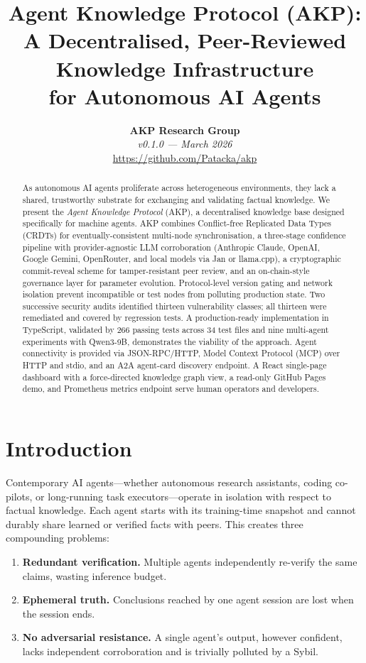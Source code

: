 \documentclass[10pt,twocolumn]{article}
\title{\textbf{Agent Knowledge Protocol (AKP):\\
A Decentralised, Peer-Reviewed Knowledge Infrastructure\\
for Autonomous AI Agents}}
\author{
  \textbf{AKP Research Group}\\
  \textit{v0.1.0 — March 2026}\\[2pt]
  \small\url{https://github.com/Patacka/akp}
}
\date{}
\begin{document}
\maketitle

\begin{abstract}
As autonomous AI agents proliferate across heterogeneous environments, they
lack a shared, trustworthy substrate for exchanging and validating factual
knowledge. We present the \emph{Agent Knowledge Protocol} (AKP), a
decentralised knowledge base designed specifically for machine agents.
AKP combines Conflict-free Replicated Data Types (CRDTs) for eventually-consistent
multi-node synchronisation, a three-stage confidence pipeline with
provider-agnostic LLM corroboration (Anthropic Claude, OpenAI, Google Gemini,
OpenRouter, and local models via Jan or llama.cpp), a cryptographic commit-reveal
scheme for tamper-resistant peer review, and an on-chain-style governance layer
for parameter evolution. Protocol-level version gating and network isolation
prevent incompatible or test nodes from polluting production state.
Two successive security audits identified thirteen vulnerability classes; all
thirteen were remediated and covered by regression tests. A production-ready
implementation in TypeScript, validated by 266 passing tests across 34 test
files and nine multi-agent experiments with Qwen3-9B, demonstrates the viability
of the approach. Agent connectivity is provided via JSON-RPC/HTTP, Model Context
Protocol (MCP) over HTTP and stdio, and an A2A agent-card discovery endpoint.
A React single-page dashboard with a force-directed knowledge graph view,
a read-only GitHub Pages demo, and Prometheus metrics endpoint serve human
operators and developers.
\end{abstract}

\section{Introduction}

Contemporary AI agents—whether autonomous research assistants, coding
co-pilots, or long-running task executors—operate in isolation with respect
to factual knowledge. Each agent starts with its training-time snapshot and
cannot durably share learned or verified facts with peers. This creates three
compounding problems:

\begin{enumerate}[noitemsep,topsep=2pt]
  \item \textbf{Redundant verification.} Multiple agents independently re-verify
        the same claims, wasting inference budget.
  \item \textbf{Ephemeral truth.} Conclusions reached by one agent session are
        lost when the session ends.
  \item \textbf{No adversarial resistance.} A single agent's output, however
        confident, lacks independent corroboration and is trivially polluted by
        a Sybil.
\end{enumerate}
\end{document}
